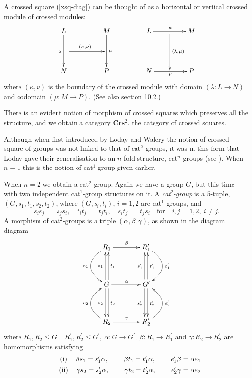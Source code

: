 \documentclass[a4paper,11pt]{article}
\theoremstyle{plain}
\theoremstyle{definition}
\begin{document}
A crossed square (\ref{xsq-diag}) can be thought of as a horizontal or vertical 
crossed module of crossed modules:
\[
\xymatrix@R=20pt@C=20pt
{ L \ar[dd]_{\lambda}  
	&  &  M \ar[dd]^{\mu} 
	      &  &  L \ar[rr]^{\kappa}
	            &  {} \ar[dd]^{(\lambda,\mu)} 
	               &  M \\ 
\quad \ar[rr]^{(\kappa,\nu)} 
    &  &  &  &  &  & \quad \\
  N &  &  P 
	      &  &  N \ar[rr]_{\nu} 
	            &  {} 
	               &  P 
} 
\]
\noindent 
where $(\kappa,\nu)$ is the boundary of the crossed module with 
domain $(\lambda : L \rightarrow N)$ and codomain $(\mu : M \rightarrow P)$. 
(See also \cite{wensley_notes} section 10.2.)

There is an evident notion of morphism of crossed squares  
which preserves all the structure, 
and we obtain a category \textbf{Crs}$^{2}$, the category of crossed squares.

Although when first introduced by Loday and Walery \cite{walery} 
the notion of crossed square of groups was not linked to that of cat$^{2}$-groups, 
it was in this form that Loday gave their generalisation 
to an $n$-fold structure, cat$^{n}$-groups (see \cite{Loday}). 
When $n=1$ this is the notion of cat$^1$-group given earlier.

When $n=2$ we obtain a cat$^{2}$-group. 
Again we have a group $G$, but this time with two independent cat$^{1}$-group 
structures on it. 
A \emph{cat$^{2}$-group} is a $5$-tuple, $(G,s_1,t_1,s_2,t_2)$, 
where $(G,s_{i},t_{i}),~ i=1,2$ are cat$^{1}$-groups, and
\[
s_{i}s_{j} ~=~ s_{j}s_{i}, \quad 
t_{i}t_{j} ~=~ t_{j}t_{i}, \quad 
s_{i}t_{j} ~=~ t_{j}s_{i}
\quad\mbox{for}\quad i,j = 1,2,~ i\neq j. 
\]
A morphism of cat$^{2}$-groups is a triple $(\alpha ,\beta ,\gamma )$,
as shown in the diagram diagram
\[
\xymatrix@R=40pt@C=40pt 
{ R_1 \ar@/_2pc/[d]_{e_1} \ar[r]^{\beta} 
	& R'_1 \ar@/^2pc/[d]^{e'_1} \\
	G \ar@<0.5ex>[u]^{s_1} \ar@<-0.5ex>[u]_{t_1} \ar@<0.5ex>[d]^{t_2} 
	\ar@<-0.5ex>[d]_{s_2} \ar[r]^{\alpha} 
	& G' \ar@<0.5ex>[u]^{s'_1} \ar@<-0.5ex>[u]_{t'_1} \ar@<0.5ex>[d]^{t'_2} 
	\ar@<-0.5ex>[d]_{s'_2} \\
	R_2 \ar@/^2pc/[u]^{e_2} \ar[r]^{\gamma} 
	& R'_2 \ar@/_2pc/[u]_{e'_2} }
\]
\noindent where 
$R_{1},R_{2} \leq G$,~ $R_{1}^{\prime}, R_{2}^{\prime} \leq G^{\prime},~ 
\alpha : G \to G^{\prime},~ \beta : R_1 \to R^{\prime}_1$ 
and $\gamma : R_2 \to R^{\prime}_2$ are homomorphisms satisfying
\begin{eqnarray*}
	&&
	\begin{tabular}{llllll}
		$%
		\text{(i)}$ & $\beta s_1=s_1^{\prime}\alpha ,$ &  & $\beta
		t_1=t_1^{\prime}\alpha ,$ &  & $e_{1}^{\prime}\beta =\alpha e_{1}$%
	\end{tabular}
	\\
	&&
	\begin{tabular}{llllll}
		$\text{(ii)}$ & $\gamma s_2=s_2^{\prime}\alpha ,$ &  & $\gamma
		t_2=t_2^{\prime}\alpha ,$ &  & $e_{2}^{\prime}\gamma =\alpha e_{2}$%
	\end{tabular}%
\end{eqnarray*}
\end{document}
